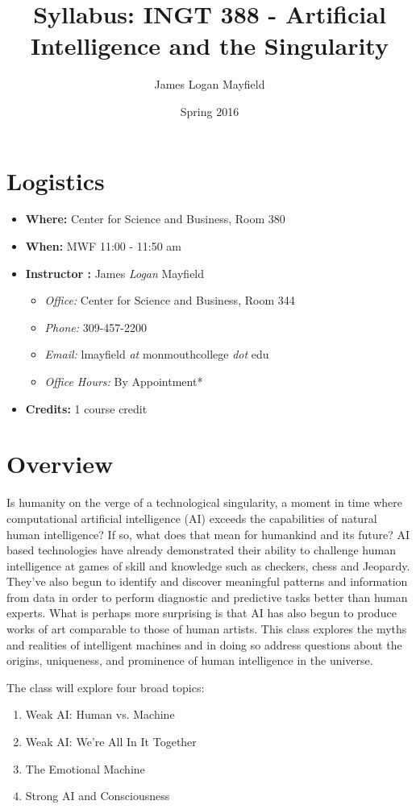 \documentclass[]{tufte-handout}
\title{Syllabus: INGT 388 - Artificial Intelligence and the Singularity}
\author{James Logan Mayfield }
\date{ Spring 2016 }
\begin{document}
\maketitle

\section{Logistics}
\begin{itemize}
\item \textbf{Where: } Center for Science and Business, Room 380
\item \textbf{When: } MWF 11:00 - 11:50 am
\item \textbf{Instructor :} James \textit{Logan} Mayfield
\begin{itemize}
\item \textit{Office: } Center for Science and Business, Room 344
\item \textit{Phone: } 309-457-2200
\item \textit{Email: } lmayfield \textit{at} monmouthcollege \textit{dot} edu
\item \textit{Office Hours: } By Appointment*
\end{itemize}
\item \textbf{Credits: } 1 course credit
\end{itemize}

\section{Overview}

Is humanity on the verge of a technological singularity, a moment in time where computational artificial intelligence (AI) exceeds the capabilities of natural human intelligence?  If so, what does that mean for humankind and its future? AI based technologies have already demonstrated their ability to challenge human intelligence at games of skill and knowledge such as checkers, chess and Jeopardy. They've also begun to identify and discover meaningful patterns and information from data in order to perform diagnostic and predictive tasks better than human experts.  What is perhaps more surprising is that AI has also begun to produce works of art comparable to those of human artists. This class explores the myths and realities of intelligent machines and in doing so address questions about the origins, uniqueness, and prominence of human intelligence in the universe.     

The class will explore four broad topics:
\begin{enumerate}
\item Weak AI: Human vs. Machine
\item Weak AI: We're All In It Together
\item The Emotional Machine
\item Strong AI and Consciousness
\end{enumerate}
  
\end{document}

